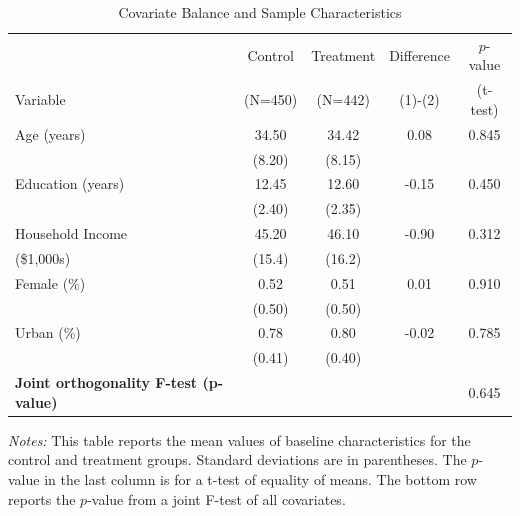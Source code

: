 \documentclass{article}
\begin{document}
\begin{table}[htbp]
    \centering
    \begin{threeparttable}
    \caption{Covariate Balance and Sample Characteristics}
    \label{tab:balance_table}
    \begin{tabular}{l *{4}{S}}
        \toprule
        & {Control} & {Treatment} & {Difference} & {$p$-value} \\
        Variable & {(N=450)} & {(N=442)} & {(1)-(2)} & {(t-test)} \\
        \midrule
        Age (years)      & 34.50  & 34.42  & 0.08  & 0.845 \\
                         & (8.20) & (8.15) &       &       \\
        Education (years) & 12.45  & 12.60  & -0.15 & 0.450 \\
                         & (2.40) & (2.35) &       &       \\
        Household Income & 45.20  & 46.10  & -0.90 & 0.312 \\
        (\$1,000s)       & (15.4) & (16.2) &       &       \\
        Female (\%)      & 0.52   & 0.51   & 0.01  & 0.910 \\
                         & (0.50) & (0.50) &       &       \\
        Urban (\%)       & 0.78   & 0.80   & -0.02 & 0.785 \\
                         & (0.41) & (0.40) &       &       \\
        \midrule
        \textbf{Joint orthogonality F-test (p-value)} & & & & 0.645 \\
        \bottomrule
    \end{tabular}
    \begin{tablenotes}
        \small
        \item \textit{Notes:} This table reports the mean values of baseline characteristics for the control and treatment groups. Standard deviations are in parentheses. The $p$-value in the last column is for a t-test of equality of means. The bottom row reports the $p$-value from a joint F-test of all covariates.
    \end{tablenotes}
    \end{threeparttable}
\end{table}
\end{document}

